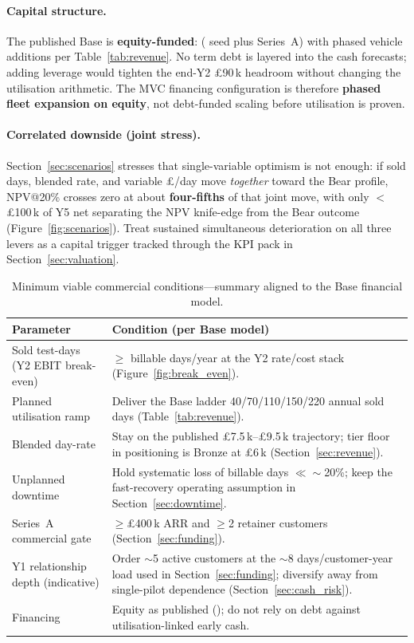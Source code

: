 \paragraph{Capital structure.}
The published Base is \textbf{equity-funded}: \totalRaise{} (\seedRound{} seed
plus \seriesARound{} Series~A) with \totalCapex{} phased vehicle additions per
Table~\ref{tab:revenue}. No term debt is layered into the cash forecasts;
adding leverage would tighten the end-Y2 \pounds90\,k headroom without changing
the utilisation arithmetic. The MVC financing configuration is therefore
\textbf{phased fleet expansion on equity}, not debt-funded scaling before
utilisation is proven.

\paragraph{Correlated downside (joint stress).}
Section~\ref{sec:scenarios} stresses that single-variable optimism is not
enough: if sold days, blended rate, and variable \pounds/day move \emph{together}
toward the Bear profile, NPV@20\% crosses zero at about \textbf{four-fifths} of
that joint move, with only ${<}$\pounds100\,k of Y5 net separating the NPV
knife-edge from the Bear outcome (Figure~\ref{fig:scenarios}). Treat sustained
simultaneous deterioration on all three levers as a capital trigger tracked
through the KPI pack in Section~\ref{sec:valuation}.

\begin{table}[H]
\centering
\caption{Minimum viable commercial conditions---summary aligned to the Base
  financial model.}
\label{tab:mvc_summary}
\begin{tabular}{p{5.0cm}p{9.0cm}}
\hline
\textbf{Parameter} & \textbf{Condition (per Base model)} \\
\hline
Sold test-days (Y2 EBIT break-even) &
  $\geq$ \breakEvenDays{} billable days/year at the Y2 rate/cost stack
  (Figure~\ref{fig:break_even}). \\
Planned utilisation ramp &
  Deliver the Base ladder 40/70/110/150/220 annual sold days
  (Table~\ref{tab:revenue}). \\
Blended day-rate &
  Stay on the published \pounds7.5\,k--\pounds9.5\,k trajectory; tier floor
  in positioning is Bronze at \pounds6\,k (Section~\ref{sec:revenue}). \\
Unplanned downtime &
  Hold systematic loss of billable days $\ll \sim$20\%; keep the
  fast-recovery operating assumption in Section~\ref{sec:downtime}. \\
Series~A commercial gate &
  $\geq$\pounds400\,k ARR and $\geq$2 retainer customers
  (Section~\ref{sec:funding}). \\
Y1 relationship depth (indicative) &
  Order $\sim$5 active customers at the $\sim$8 days/customer-year load used
  in Section~\ref{sec:funding}; diversify away from single-pilot dependence
  (Section~\ref{sec:cash_risk}). \\
Financing &
  Equity as published (\totalRaise{}); do not rely on debt against
  utilisation-linked early cash. \\
\hline
\end{tabular}
\end{table}

